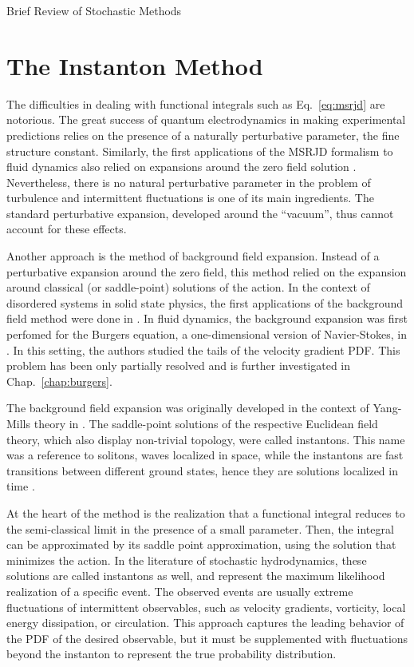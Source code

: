 \begin{chapter}{Brief Review of Stochastic Methods}
\section{The Instanton Method}

The difficulties in dealing with functional integrals such
as Eq.~\eqref{eq:msrjd} are notorious. The great success
of quantum electrodynamics in making experimental predictions
relies on the presence of a naturally perturbative parameter, the
fine structure constant. Similarly, the first applications of
the MSRJD formalism to fluid dynamics also relied on expansions
around the zero field solution \parencite{forster1977}.
Nevertheless, there is no
natural perturbative parameter in the problem of turbulence
and intermittent
fluctuations is one of its main ingredients.
The standard perturbative expansion, developed around the \enquote{vacuum}, thus cannot account for these effects.


Another approach is the method of background field expansion.
Instead of a perturbative expansion around the zero field, this method
relied on the expansion around classical (or saddle-point) solutions
of the action.
In the context of disordered systems in
solid state physics, the first applications of the background field
method were done in
\textcite{zittartz1966,langer1967,langer1969}.
In fluid dynamics, the background expansion was first perfomed
for the Burgers equation, a one-dimensional
version of Navier-Stokes, in \textcite{gurarie1996}.
In this setting, the authors studied the tails of the velocity gradient PDF.
This problem has been only
partially resolved and is further investigated in Chap.~\ref{chap:burgers}.

The background field expansion was originally developed in the context of
Yang-Mills theory in \textcite{belavin1975}.
The saddle-point solutions of the respective Euclidean field theory, which also
display non-trivial topology, were called instantons.
This name was a reference to solitons,
waves localized in space, while the instantons are fast transitions
between different ground states, hence they are solutions localized in time
\parencite{schafer1998}.

At the heart of the method is the realization that a
functional integral reduces to the semi-classical limit in the presence
of a small parameter. Then, the integral can be approximated
by its saddle point approximation, using the solution
that minimizes the action.
In the literature of stochastic hydrodynamics, these solutions are called
instantons as well, and represent the maximum likelihood
realization of a specific event. The observed events are usually extreme
fluctuations of intermittent observables, such as velocity gradients,
vorticity, local energy dissipation, or circulation.
This approach captures the leading behavior of the PDF of the desired observable,
but it must be supplemented with fluctuations beyond the instanton
to represent the true probability distribution.


\end{chapter}
